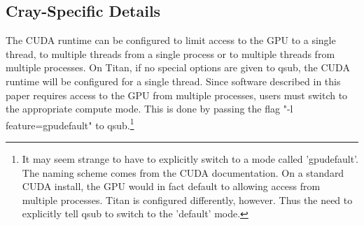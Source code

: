 \subsection{Cray-Specific Details}
\label{subsec:cray-specific}

The CUDA runtime can be configured to limit access to the GPU to a single thread, to multiple threads from a single process or to multiple threads from multiple processes.  On Titan, if no special options are given to qsub, the CUDA runtime will be configured for a single thread.  Since software described in this paper requires access to the GPU from multiple processes, users must switch to the appropriate compute mode.  This is done by passing the flag "-l feature=gpudefault" to qsub.\footnote{It may seem strange to have to explicitly switch to a mode called 'gpudefault'.  The naming scheme comes from the CUDA documentation.  On a standard CUDA install, the GPU would in fact default to allowing access from multiple processes.  Titan is configured differently, however.  Thus the need to explicitly tell qsub to switch to the 'default' mode.}

